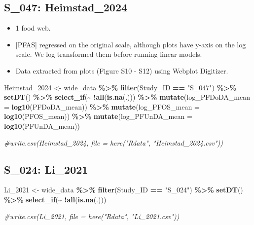\documentclass[
]{article}
\newenvironment{Shaded}{\begin{snugshade}}{\end{snugshade}}
\newcommand{\AttributeTok}[1]{\textcolor[rgb]{0.13,0.29,0.53}{#1}}
\newcommand{\CommentTok}[1]{\textcolor[rgb]{0.56,0.35,0.01}{\textit{#1}}}
\newcommand{\FunctionTok}[1]{\textcolor[rgb]{0.13,0.29,0.53}{\textbf{#1}}}
\newcommand{\NormalTok}[1]{#1}
\newcommand{\OtherTok}[1]{\textcolor[rgb]{0.56,0.35,0.01}{#1}}
\newcommand{\SpecialCharTok}[1]{\textcolor[rgb]{0.81,0.36,0.00}{\textbf{#1}}}
\newcommand{\StringTok}[1]{\textcolor[rgb]{0.31,0.60,0.02}{#1}}
\providecommand{\tightlist}{%
  \setlength{\itemsep}{0pt}\setlength{\parskip}{0pt}}
\begin{document}
\subsection{S\_047: Heimstad\_2024}\label{s_047-heimstad_2024}

\begin{itemize}
\tightlist
\item
  1 food web.
\item
  {[}PFAS{]} regressed on the original scale, although plots have y-axis
  on the log scale. We log-transformed them before running linear
  models.
\item
  Data extracted from plots (Figure S10 - S12) using Webplot Digitizer.
\end{itemize}

\begin{Shaded}
\begin{Highlighting}[]
\NormalTok{Heimstad\_2024 }\OtherTok{\textless{}{-}}\NormalTok{ wide\_data }\SpecialCharTok{\%\textgreater{}\%} 
  \FunctionTok{filter}\NormalTok{(Study\_ID }\SpecialCharTok{==} \StringTok{"S\_047"}\NormalTok{) }\SpecialCharTok{\%\textgreater{}\%} 
  \FunctionTok{setDT}\NormalTok{() }\SpecialCharTok{\%\textgreater{}\%}
  \FunctionTok{select\_if}\NormalTok{(}\SpecialCharTok{\textasciitilde{}} \SpecialCharTok{!}\FunctionTok{all}\NormalTok{(}\FunctionTok{is.na}\NormalTok{(.))) }\SpecialCharTok{\%\textgreater{}\%} 
  \FunctionTok{mutate}\NormalTok{(}\AttributeTok{log\_PFDoDA\_mean =} \FunctionTok{log10}\NormalTok{(PFDoDA\_mean)) }\SpecialCharTok{\%\textgreater{}\%}
  \FunctionTok{mutate}\NormalTok{(}\AttributeTok{log\_PFOS\_mean =} \FunctionTok{log10}\NormalTok{(PFOS\_mean)) }\SpecialCharTok{\%\textgreater{}\%} 
  \FunctionTok{mutate}\NormalTok{(}\AttributeTok{log\_PFUnDA\_mean =} \FunctionTok{log10}\NormalTok{(PFUnDA\_mean))}

\CommentTok{\#write.csv(Heimstad\_2024, file = here("Rdata", "Heimstad\_2024.csv"))}
\end{Highlighting}
\end{Shaded}

\subsection{S\_024: Li\_2021}\label{s_024-li_2021}

\begin{Shaded}
\begin{Highlighting}[]
\NormalTok{Li\_2021 }\OtherTok{\textless{}{-}}\NormalTok{ wide\_data }\SpecialCharTok{\%\textgreater{}\%} 
  \FunctionTok{filter}\NormalTok{(Study\_ID }\SpecialCharTok{==} \StringTok{"S\_024"}\NormalTok{) }\SpecialCharTok{\%\textgreater{}\%} 
  \FunctionTok{setDT}\NormalTok{() }\SpecialCharTok{\%\textgreater{}\%}
  \FunctionTok{select\_if}\NormalTok{(}\SpecialCharTok{\textasciitilde{}} \SpecialCharTok{!}\FunctionTok{all}\NormalTok{(}\FunctionTok{is.na}\NormalTok{(.)))}

\CommentTok{\#write.csv(Li\_2021, file = here("Rdata", "Li\_2021.csv"))}
\end{Highlighting}
\end{Shaded}
\end{document}
